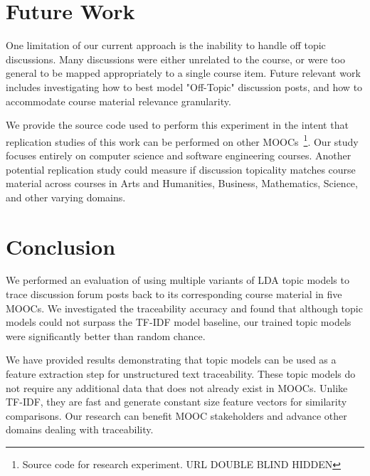 \documentclass[sigconf, anonymous]{acmart}
\begin{document}
\section{Future Work}
One limitation of our current approach is the inability to handle off topic discussions.
Many discussions were either unrelated to the course, or were too general to be mapped appropriately to a single course item.
Future relevant work includes investigating how to best model "Off-Topic" discussion posts, and how to accommodate course material relevance granularity.

We provide the source code used to perform this experiment in the intent that replication studies of this work can be performed on other MOOCs~\footnote{Source code for research experiment.
    URL DOUBLE BLIND HIDDEN}.
Our study focuses entirely on computer science and software engineering courses.
Another potential replication study could measure if discussion topicality matches course material across courses in Arts and Humanities, Business, Mathematics, Science, and other varying domains.

\section{Conclusion}
We performed an evaluation of using multiple variants of LDA topic models to trace discussion forum posts back to its corresponding course material in five MOOCs.
We investigated the traceability accuracy and found that although topic models could not surpass the TF-IDF model baseline, our trained topic models were significantly better than random chance.

We have provided results demonstrating that topic models can be used as a feature extraction step for unstructured text traceability.
These topic models do not require any additional data that does not already exist in MOOCs.
Unlike TF-IDF, they are fast and generate constant size feature vectors for similarity comparisons.
Our research can benefit MOOC stakeholders and advance other domains dealing with traceability.



\end{document}
